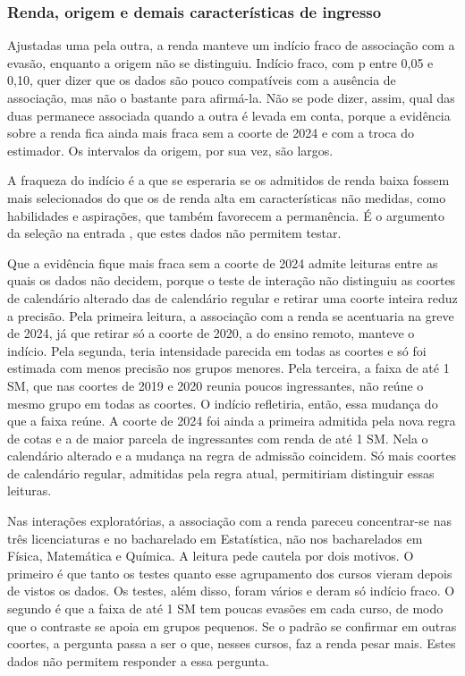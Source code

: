 \documentclass[12pt,a4paper]{article}
\begin{document}
\subsubsection{Renda, origem e demais características de ingresso}
\label{sec:disc-renda-origem}

Ajustadas uma pela outra, a renda manteve um indício fraco de associação com a evasão, enquanto a origem não se distinguiu. Indício fraco, com p entre 0,05 e 0,10, quer dizer que os dados são pouco compatíveis com a ausência de associação, mas não o bastante para afirmá-la. Não se pode dizer, assim, qual das duas permanece associada quando a outra é levada em conta, porque a evidência sobre a renda fica ainda mais fraca sem a coorte de 2024 e com a troca do estimador. Os intervalos da origem, por sua vez, são largos.

A fraqueza do indício é a que se esperaria se os admitidos de renda baixa fossem mais selecionados do que os de renda alta em características não medidas, como habilidades e aspirações, que também favorecem a permanência. É o argumento da seleção na entrada \citep{mare1980social}, que estes dados não permitem testar.

Que a evidência fique mais fraca sem a coorte de 2024 admite leituras entre as quais os dados não decidem, porque o teste de interação não distinguiu as coortes de calendário alterado das de calendário regular e retirar uma coorte inteira reduz a precisão. Pela primeira leitura, a associação com a renda se acentuaria na greve de 2024, já que retirar só a coorte de 2020, a do ensino remoto, manteve o indício. Pela segunda, teria intensidade parecida em todas as coortes e só foi estimada com menos precisão nos grupos menores. Pela terceira, a faixa de até 1 SM, que nas coortes de 2019 e 2020 reunia poucos ingressantes, não reúne o mesmo grupo em todas as coortes. O indício refletiria, então, essa mudança do que a faixa reúne. A coorte de 2024 foi ainda a primeira admitida pela nova regra de cotas e a de maior parcela de ingressantes com renda de até 1 SM. Nela o calendário alterado e a mudança na regra de admissão coincidem. Só mais coortes de calendário regular, admitidas pela regra atual, permitiriam distinguir essas leituras.

Nas interações exploratórias, a associação com a renda pareceu concentrar-se nas três licenciaturas e no bacharelado em Estatística, não nos bacharelados em Física, Matemática e Química. A leitura pede cautela por dois motivos. O primeiro é que tanto os testes quanto esse agrupamento dos cursos vieram depois de vistos os dados. Os testes, além disso, foram vários e deram só indício fraco. O segundo é que a faixa de até 1 SM tem poucas evasões em cada curso, de modo que o contraste se apoia em grupos pequenos. Se o padrão se confirmar em outras coortes, a pergunta passa a ser o que, nesses cursos, faz a renda pesar mais. Estes dados não permitem responder a essa pergunta.
\end{document}

